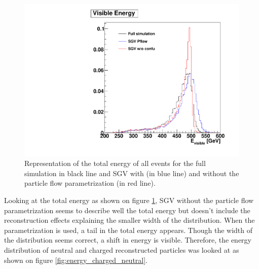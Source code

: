 \begin{figure}[htbp!]
  \centering
  \includegraphics[width=1\linewidth]{../Thesis_Plots/SGV/Plots/Evis.pdf}
  \caption{Representation of the total energy of all events for the full simulation in black line and SGV with (in blue line) and without the particle flow parametrization (in red line).}
  \label{fig:energy_total}
\end{figure}

Looking at the total energy as shown on figure \ref{fig:energy_total}, SGV without the particle flow parametrization seems to describe well the total energy but doesn't include the reconstruction effects explaining the smaller width of the distribution. When the parametrization is used, a tail in the total energy appears. Though the width of the distribution seems correct, a shift in energy is visible. Therefore, the energy distribution of neutral and charged reconstructed particles was looked at as shown on figure \ref{fig:energy_charged_neutral}.

